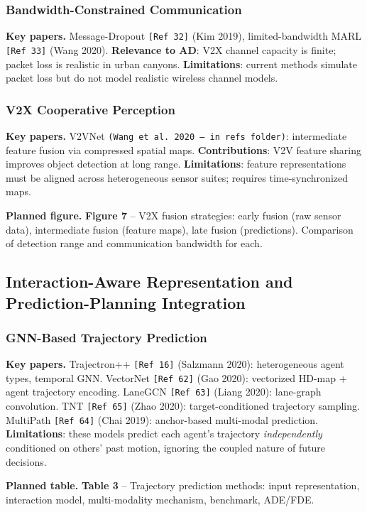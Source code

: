 \documentclass[12pt, a4paper]{article}
\begin{document}
\subsubsection{Bandwidth-Constrained Communication}

\begin{outline_note}
\textbf{Key papers.}
Message-Dropout \texttt{[Ref\,32]} (Kim 2019),
limited-bandwidth MARL \texttt{[Ref\,33]} (Wang 2020).
\textbf{Relevance to AD}: V2X channel capacity is finite; packet loss
is realistic in urban canyons.
\textbf{Limitations}: current methods simulate packet loss but do not
model realistic wireless channel models.
\end{outline_note}

\subsubsection{V2X Cooperative Perception}

\begin{outline_note}
\textbf{Key papers.}
V2VNet \texttt{(Wang et al.\ 2020 -- in refs folder)}: intermediate feature
fusion via compressed spatial maps.
\textbf{Contributions}: V2V feature sharing improves object detection
at long range.
\textbf{Limitations}: feature representations must be aligned across
heterogeneous sensor suites; requires time-synchronized maps.

\textbf{Planned figure.}
\textbf{Figure 7} -- V2X fusion strategies: early fusion (raw sensor data),
intermediate fusion (feature maps), late fusion (predictions).
Comparison of detection range and communication bandwidth for each.
\end{outline_note}

\subsection{Interaction-Aware Representation and Prediction-Planning Integration}
\label{sec:representation}

\subsubsection{GNN-Based Trajectory Prediction}

\begin{outline_note}
\textbf{Key papers.}
Trajectron++ \texttt{[Ref\,16]} (Salzmann 2020): heterogeneous agent types,
temporal GNN.
VectorNet \texttt{[Ref\,62]} (Gao 2020): vectorized HD-map + agent trajectory
encoding.
LaneGCN \texttt{[Ref\,63]} (Liang 2020): lane-graph convolution.
TNT \texttt{[Ref\,65]} (Zhao 2020): target-conditioned trajectory sampling.
MultiPath \texttt{[Ref\,64]} (Chai 2019): anchor-based multi-modal prediction.
\textbf{Limitations}: these models predict each agent's trajectory
\emph{independently} conditioned on others' past motion, ignoring
the coupled nature of future decisions.

\textbf{Planned table.}
\textbf{Table 3} -- Trajectory prediction methods: input representation,
interaction model, multi-modality mechanism, benchmark, ADE/FDE.
\end{outline_note}
\end{document}
